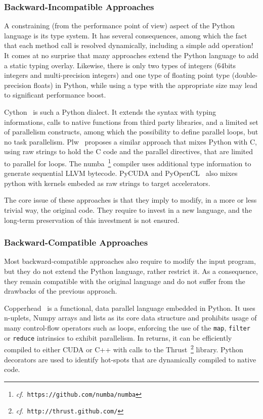 \documentclass{llncs}
\begin{document}
\subsubsection{Backward-Incompatible Approaches}

A constraining (from the performance point of view) aspect of the Python
language is its type system. It has several consequences, among which the fact
that each method call is resolved dynamically, including a simple add
operation! It comes at no surprise that many approaches extend the Python
language to add a static typing overlay. Likewise, there is only two types of
integers (64bits integers and multi-precision integers) and one type of floating
point type (double-precision floats) in Python, while using a type with the
appropriate size may lead to significant performance boost.

Cython~\cite{cython2010} is such a Python dialect. It extends the syntax with
typing informations, calls to native functions from third party libraries, and a
limited set of parallelism constructs, among which the possibility to define
parallel loops, but no task parallelism. Plw~\cite{dongara2007} proposes a
similar approach that mixes Python with C, using raw strings to hold the C code
and the parallel directives, that are limited to parallel for loops.  The
numba~\footnote{\emph{cf}.\ \texttt{https://github.com/numba/numba}} compiler
uses additional type information to generate sequential LLVM bytecode.  PyCUDA
and PyOpenCL~\cite{klockner2012} also mixes python with kernels embeded as raw
strings to target accelerators.

The core issue of these approaches is that they imply to modify, in a more or
less trivial way, the original code. They require to invest in a new language,
and the long-term preservation of this investment is not ensured.

\subsubsection{Backward-Compatible Approaches}

Most backward-compatible approaches also require to modify the input program,
but they do not extend the Python language, rather restrict it. As a
consequence, they remain compatible with the original language and do not suffer
from the drawbacks of the previous approach.

Copperhead~\cite{shedskin2006} is a functional, data parallel language embedded in
Python. It uses n-uplets, Numpy arrays and lists as its core data structure and
prohibits usage of many control-flow operators such as loops, enforcing the use
of the \texttt{map}, \texttt{filter} or \texttt{reduce} intrinsics to exhibit
parallelism. In returns, it can be efficiently compiled to either CUDA or C++
with calls to the Thrust~\footnote{\emph{cf}.\
\texttt{http://thrust.github.com/}} library. Python decorators are used to
identify hot-spots that are dynamically compiled to native code.
\end{document}
